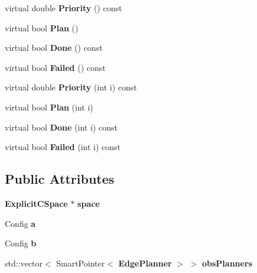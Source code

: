 \begin{DoxyCompactItemize}
\item 
virtual double {\bfseries Priority} () const \label{classExplicitEdgePlanner_a03b16719f5f7cbc4bfe539bcf13ea68b}

\item 
virtual bool {\bfseries Plan} ()\label{classExplicitEdgePlanner_a7fe703e011dc50baee57d0f95c35b7d1}

\item 
virtual bool {\bfseries Done} () const \label{classExplicitEdgePlanner_ace8478b1ded61da2c1d0c3ed794c947d}

\item 
virtual bool {\bfseries Failed} () const \label{classExplicitEdgePlanner_ab834b2daedd5cdadc8421afd16728687}

\item 
virtual double {\bfseries Priority} (int i) const \label{classExplicitEdgePlanner_aeb6d901af7c78818322a46e2fc5d0560}

\item 
virtual bool {\bfseries Plan} (int i)\label{classExplicitEdgePlanner_ac22ea5a960d67825c600cd39ee1fedde}

\item 
virtual bool {\bfseries Done} (int i) const \label{classExplicitEdgePlanner_a1a0177b2d848f17e35af5f96dd60ddbd}

\item 
virtual bool {\bfseries Failed} (int i) const \label{classExplicitEdgePlanner_a4d17d69a236fc28b246c2b7e70a69b96}

\end{DoxyCompactItemize}
\subsection*{Public Attributes}
\begin{DoxyCompactItemize}
\item 
{\bf Explicit\+C\+Space} $\ast$ {\bfseries space}\label{classExplicitEdgePlanner_a6b64d3482bef964eb8d881b27ded090b}

\item 
Config {\bfseries a}\label{classExplicitEdgePlanner_a15567c94d026915d6c08a2cd2fdfbcf9}

\item 
Config {\bfseries b}\label{classExplicitEdgePlanner_affb7484d4453684ea2551e44bed17af4}

\item 
std\+::vector$<$ Smart\+Pointer$<$ {\bf Edge\+Planner} $>$ $>$ {\bfseries obs\+Planners}\label{classExplicitEdgePlanner_a353c820da7545a37eb7756892240be31}

\end{DoxyCompactItemize}


